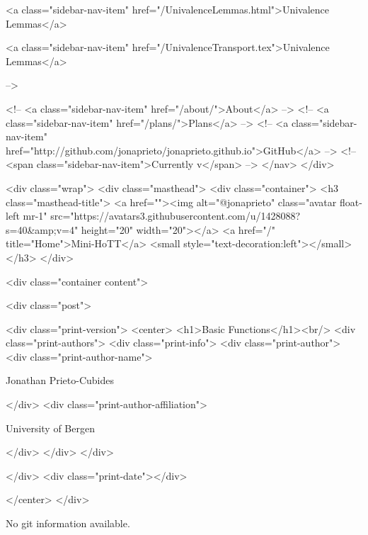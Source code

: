       
    
      
        
          <a class="sidebar-nav-item" href="/UnivalenceLemmas.html">Univalence Lemmas</a>
        
      
    
      
        
          <a class="sidebar-nav-item" href="/UnivalenceTransport.tex">Univalence Lemmas</a>
        
      
     -->

    <!-- <a class="sidebar-nav-item" href="/about/">About</a> -->
    <!-- <a class="sidebar-nav-item" href="/plans/">Plans</a> -->
    <!-- <a class="sidebar-nav-item" href="http://github.com/jonaprieto/jonaprieto.github.io">GitHub</a> -->
    <!-- <span class="sidebar-nav-item">Currently v</span> -->
  </nav>
</div>

    <div class="wrap">
      <div class="masthead">
        <div class="container">
          <h3 class="masthead-title">
            <a href=""><img alt="@jonaprieto" class="avatar float-left mr-1" src="https://avatars3.githubusercontent.com/u/1428088?s=40&amp;v=4" height="20" width="20"></a>
            <a href="/" title="Home">Mini-HoTT</a>
            <small style="text-decoration:left"></small>
          </h3>
        </div>
      
      <div class="container content">
        







<div class="post">

  <div class="print-version">
    <center>
      <h1>Basic Functions</h1><br/>
        <div class="print-authors">
          <div class="print-info">
            <div class="print-author">
              <div class="print-author-name">
                
                  Jonathan Prieto-Cubides
                
              </div>
              <div class="print-author-affiliation">
                
                  University of Bergen
                
                </div>
            </div>
          </div>
          
          
        </div>
        <div class="print-date"></div>
        
        
    </center>
  </div>

  
  No git information available.
  
